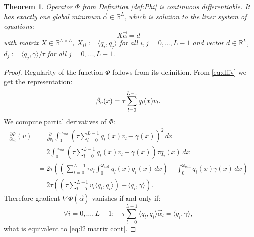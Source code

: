\documentclass[a4paper,11pt,bibliography=totoc,listof=totoc,headinclude=true,cleardoublepage=empty,oneside]{scrbook}
\newtheorem{theorem}{Theorem}[chapter]
\newcommand{\R}{\mathbb{R}}
\newcommand{\e}{\mathrm{end}}
\begin{document}
\begin{theorem}
    Operator $\Phi$ from Definition \ref{def:Phi} is continuous differentiable. It has exactly one global minimum $\Vec{\alpha} \in \R^L$, which is solution to the liner system of equations:
    \begin{equation}\label{eq:l2 matrix cont}
        X \Vec{\alpha} = d
    \end{equation}
    with matrix $X\in \R^{L\times L}$, $X_{ij} := \langle q_i, q_j \rangle$ for all $i, j = 0, \dots, L-1$ and vector $d \in \R^L$, $d_j := \langle q_j, \gamma\rangle/\tau$ for all $j = 0, \dots, L-1$.
\end{theorem}
\begin{proof}
    Regularity of the function $\Phi$ follows from its definition. From \eqref{eq:dffv} we get the representation: 
    \begin{equation*}
        \Tilde{\beta_v} (x) = \tau \sum_{l=0}^{L-1} q_l(x) v_l.
    \end{equation*}
    We compute partial derivatives of $\Phi$:
    \begin{align*}
        \frac{\partial \Phi}{\partial v_i}(v) &= \frac{\partial}{\partial v_i} \int_0^{\omega_\e} \left(\tau \sum_{l=0}^{L-1} q_l(x) v_l - \gamma(x) \right)^2 \, dx \\ &= 2 \int_0^{\omega_\e} \left(\tau \sum_{l=0}^{L-1} q_l(x) v_l - \gamma(x) \right)\tau q_i(x) \, dx \\ &= 2 \tau \left(\left(\sum_{l=0}^{L-1} \tau v_l \int_0^{\omega_\e} q_l(x) q_i(x) \, dx \right) - \int_0^{\omega_\e} q_i(x)\gamma(x) \, dx \right) \\ &= 2\tau \left( \left( \tau\sum_{l=0}^{L-1} v_l \langle q_l, q_i\rangle \right) - \langle q_i, \gamma\rangle \right).
    \end{align*}
    Therefore gradient $\nabla\Phi(\Vec{\alpha})$ vanishes if and only if:
    \begin{equation*}
        \forall i = 0, \dots, L-1: \quad  \tau\sum_{l=0}^{L-1} \langle q_l, q_i\rangle \Vec{\alpha}_l = \langle q_i, \gamma \rangle,
    \end{equation*}
    what is equivalent to \eqref{eq:l2 matrix cont}.
    

\end{proof}
\end{document}
